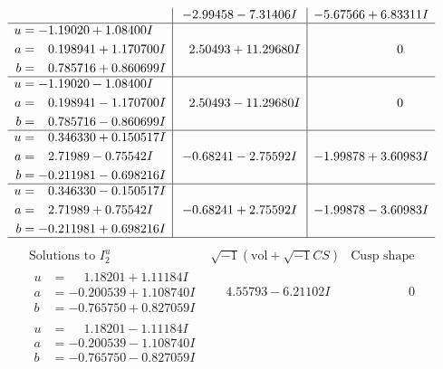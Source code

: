 \documentclass[1p]{elsarticle_modified}
\theoremstyle{definition}
\newcommand{\I}{\sqrt{-1}}
\begin{document}
$$\begin{array}{c|c|c}
 & -2.99458 - 7.31406 I & -5.67566 + 6.83311 I \\ \hline\begin{aligned}
u &= -1.19020 + 1.08400 I \\
a &= \phantom{-}0.198941 + 1.170700 I \\
b &= \phantom{-}0.785716 + 0.860699 I\end{aligned}
 & \phantom{-}2.50493 + 11.29680 I & \phantom{-0.000000 } 0 \\ \hline\begin{aligned}
u &= -1.19020 - 1.08400 I \\
a &= \phantom{-}0.198941 - 1.170700 I \\
b &= \phantom{-}0.785716 - 0.860699 I\end{aligned}
 & \phantom{-}2.50493 - 11.29680 I & \phantom{-0.000000 } 0 \\ \hline\begin{aligned}
u &= \phantom{-}0.346330 + 0.150517 I \\
a &= \phantom{-}2.71989 - 0.75542 I \\
b &= -0.211981 - 0.698216 I\end{aligned}
 & -0.68241 - 2.75592 I & -1.99878 + 3.60983 I \\ \hline\begin{aligned}
u &= \phantom{-}0.346330 - 0.150517 I \\
a &= \phantom{-}2.71989 + 0.75542 I \\
b &= -0.211981 + 0.698216 I\end{aligned}
 & -0.68241 + 2.75592 I & -1.99878 - 3.60983 I\\
 \hline 
 \end{array}$$\newpage$$\begin{array}{c|c|c}  
\text{Solutions to }I^u_{2}& \I (\text{vol} + \sqrt{-1}CS) & \text{Cusp shape}\\
 \hline 
\begin{aligned}
u &= \phantom{-}1.18201 + 1.11184 I \\
a &= -0.200539 + 1.108740 I \\
b &= -0.765750 + 0.827059 I\end{aligned}
 & \phantom{-}4.55793 - 6.21102 I & \phantom{-0.000000 } 0 \\ \hline\begin{aligned}
u &= \phantom{-}1.18201 - 1.11184 I \\
a &= -0.200539 - 1.108740 I \\
b &= -0.765750 - 0.827059 I\end{aligned}

\end{array}$$
\end{document}
